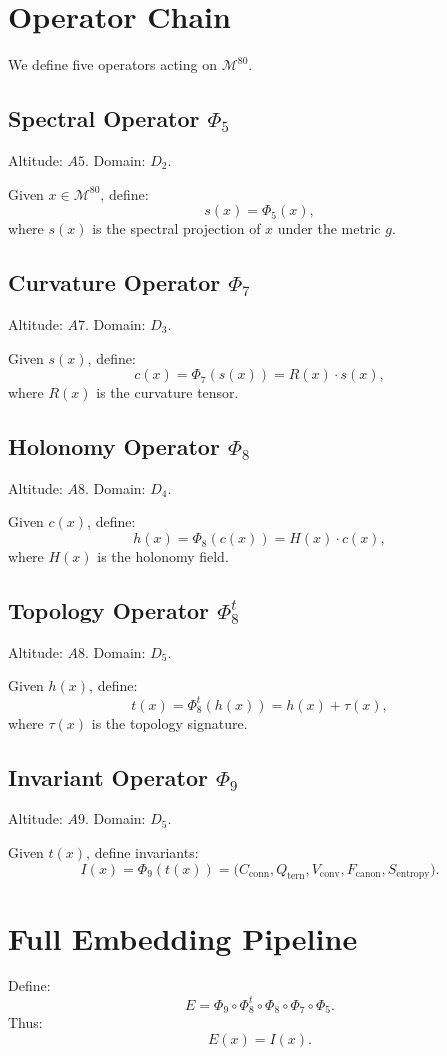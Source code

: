 \documentclass[11pt]{article}
\begin{document}
\section{Operator Chain}
We define five operators acting on $\mathcal{M}^{80}$.

\subsection{Spectral Operator $\Phi_5$}
Altitude: $A5$.
Domain: $D_2$.

Given $x \in \mathcal{M}^{80}$, define:
\[
s(x) = \Phi_5(x),
\]
where $s(x)$ is the spectral projection of $x$ under the metric $g$.

\subsection{Curvature Operator $\Phi_7$}
Altitude: $A7$.
Domain: $D_3$.

Given $s(x)$, define:
\[
c(x) = \Phi_7(s(x)) = R(x) \cdot s(x),
\]
where $R(x)$ is the curvature tensor.

\subsection{Holonomy Operator $\Phi_8$}
Altitude: $A8$.
Domain: $D_4$.

Given $c(x)$, define:
\[
h(x) = \Phi_8(c(x)) = H(x) \cdot c(x),
\]
where $H(x)$ is the holonomy field.

\subsection{Topology Operator $\Phi_8^t$}
Altitude: $A8$.
Domain: $D_5$.

Given $h(x)$, define:
\[
t(x) = \Phi_8^t(h(x)) = h(x) + \tau(x),
\]
where $\tau(x)$ is the topology signature.

\subsection{Invariant Operator $\Phi_9$}
Altitude: $A9$.
Domain: $D_5$.

Given $t(x)$, define invariants:
\[
I(x) = \Phi_9(t(x)) =
\bigl( C_{\text{conn}}, Q_{\text{tern}}, V_{\text{conv}},
F_{\text{canon}}, S_{\text{entropy}} \bigr).
\]

\section{Full Embedding Pipeline}
Define:
\[
E = \Phi_9 \circ \Phi_8^t \circ \Phi_8 \circ \Phi_7 \circ \Phi_5.
\]
Thus:
\[
E(x) = I(x).
\]
\end{document}

